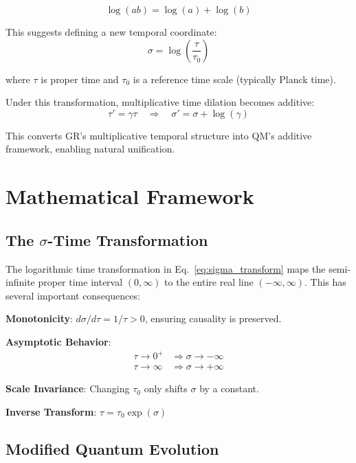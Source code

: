 \documentclass[12pt,a4paper]{article}
\begin{document}
\begin{equation}
\log(ab) = \log(a) + \log(b)
\end{equation}

This suggests defining a new temporal coordinate:
\begin{equation}
\boxed{\sigma = \log\left(\frac{\tau}{\tau_0}\right)}
\label{eq:sigma_transform}
\end{equation}

where $\tau$ is proper time and $\tau_0$ is a reference time scale (typically Planck time).

Under this transformation, multiplicative time dilation becomes additive:
\begin{equation}
\tau' = \gamma \tau \quad \Rightarrow \quad \sigma' = \sigma + \log(\gamma)
\label{eq:additive_dilation}
\end{equation}

This converts GR's multiplicative temporal structure into QM's additive framework, enabling natural unification.

\section{Mathematical Framework}

\subsection[The Sigma-Time Transformation]{The $\sigma$-Time Transformation}

The logarithmic time transformation in Eq.~\eqref{eq:sigma_transform} maps the semi-infinite proper time interval $(0, \infty)$ to the entire real line $(-\infty, \infty)$. This has several important consequences:

\textbf{Monotonicity}: $d\sigma/d\tau = 1/\tau > 0$, ensuring causality is preserved.

\textbf{Asymptotic Behavior}: 
\begin{align}
\tau \to 0^+ &\Rightarrow \sigma \to -\infty \\
\tau \to \infty &\Rightarrow \sigma \to +\infty
\end{align}

\textbf{Scale Invariance}: Changing $\tau_0$ only shifts $\sigma$ by a constant.

\textbf{Inverse Transform}: $\tau = \tau_0 \exp(\sigma)$

\subsection{Modified Quantum Evolution}
\end{document}
